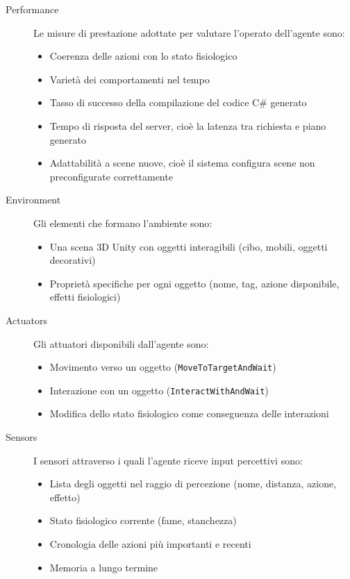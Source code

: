 \begin{description}
	\item[Performance] Le misure di prestazione adottate per valutare l'operato dell'agente sono:
	\begin{itemize}
		\item Coerenza delle azioni con lo stato fisiologico
		\item Varietà dei comportamenti nel tempo
		\item Tasso di successo della compilazione del codice C\# generato
		\item Tempo di risposta del server, cioè la latenza tra richiesta e piano generato
		\item Adattabilità a scene nuove, cioè il sistema configura scene non preconfigurate correttamente 
	\end{itemize}
	
	\item[Environment] Gli elementi che formano l'ambiente sono:
	\begin{itemize}
		\item Una scena 3D Unity con oggetti interagibili (cibo, mobili, oggetti decorativi)
		\item Proprietà specifiche per ogni oggetto (nome, tag, azione disponibile, effetti fisiologici)
	\end{itemize}
	
	\item[Actuators] Gli attuatori disponibili dall'agente sono:
	\begin{itemize}
		\item Movimento verso un oggetto (\texttt{MoveToTargetAndWait})
		\item Interazione con un oggetto (\texttt{InteractWithAndWait})
		\item Modifica dello stato fisiologico come conseguenza delle interazioni
	\end{itemize}
	
	\item[Sensors] I sensori attraverso i quali l'agente riceve input percettivi sono:
	\begin{itemize}
		\item Lista degli oggetti nel raggio di percezione (nome, distanza, azione, effetto)
		\item Stato fisiologico corrente (fame, stanchezza)
		\item Cronologia delle azioni più importanti e recenti
		\item Memoria a lungo termine
	\end{itemize}
\end{description}

